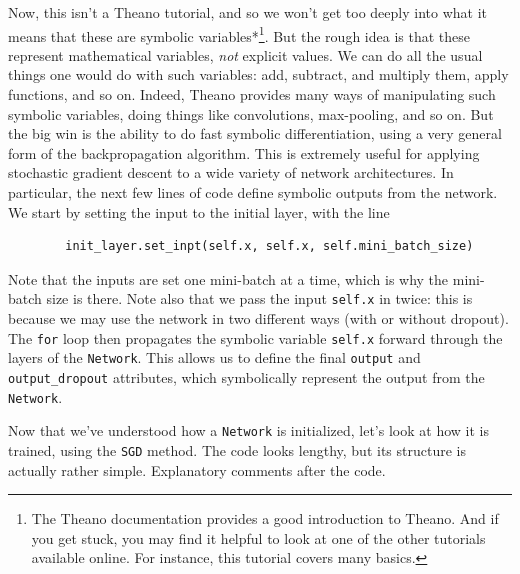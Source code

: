 Now, this isn't a Theano tutorial, and so we won't get too deeply into what it means that these are symbolic variables*\footnote{The Theano documentation provides a good introduction to Theano. And if you get stuck, you may find it helpful to look at one of the other tutorials available online. For instance, this tutorial covers many basics.}. But the rough idea is that these represent mathematical variables, \emph{not} explicit values. We can do all the usual things one would do with such variables: add, subtract, and multiply them, apply functions, and so on. Indeed, Theano provides many ways of manipulating such symbolic variables, doing things like convolutions, max-pooling, and so on. But the big win is the ability to do fast symbolic differentiation, using a very general form of the backpropagation algorithm. This is extremely useful for applying stochastic gradient descent to a wide variety of network architectures. In particular, the next few lines of code define symbolic outputs from the network. We start by setting the input to the initial layer, with the line



\begin{lstlisting}
        init_layer.set_inpt(self.x, self.x, self.mini_batch_size)

\end{lstlisting}


Note that the inputs are set one mini-batch at a time, which is why the mini-batch size is there. Note also that we pass the input \texttt{self.x} in twice: this is because we may use the network in two different ways (with or without dropout). The \texttt{for} loop then propagates the symbolic variable \texttt{self.x} forward through the layers of the \texttt{Network}. This allows us to define the final \texttt{output} and \texttt{output\_\allowbreak{}dropout} attributes, which symbolically represent the output from the \texttt{Network}.


Now that we've understood how a \texttt{Network} is initialized, let's look at how it is trained, using the \texttt{SGD} method. The code looks lengthy, but its structure is actually rather simple. Explanatory comments after the code.



